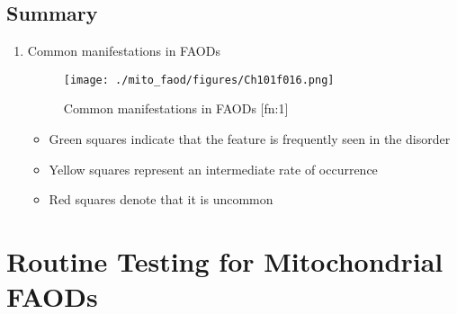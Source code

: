 \documentclass{scrartcl}
\begin{document}
\subsection{Summary}
\label{sec:org5e702bb}
\begin{enumerate}
\item Common manifestations in FAODs
\label{sec:orgf9e91c3}
\begin{figure}[htbp]
\centering
\texttt{[image: ./mito\_faod/figures/Ch101f016.png]}
\caption{\label{fig:org735950c}
Common manifestations in FAODs [fn:1]}
\end{figure}

\begin{itemize}
\item Green squares indicate that the feature is frequently seen in the disorder
\item Yellow squares represent an intermediate rate of occurrence
\item Red squares denote that it is uncommon
\end{itemize}
\end{enumerate}

\section{Routine Testing for Mitochondrial FAODs}
\label{sec:org09ceade}
\end{document}
